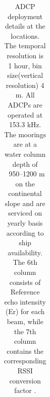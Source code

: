 \documentclass[authoryear,review,12pt]{elsarticle}
\begin{document}
\linespread{1} 	
\begin{table}[htbp]

	{\footnotesize

		\captionsetup{justification=justified,font=footnotesize,skip=0.05\baselineskip} %
		\caption{ADCP deployment details at the locations. The temporal resolution is 1 hour, bin size(vertical resolution) 4 m. All ADCPs are operated at 153.3 kHz. The moorings are at a water column depth of ~950--1200 m on the continental slope and are serviced on yearly basis according to ship availability. The 6th column consists of Reference echo intensity (Er) for each beam, while the 7th column contains the corresponding RSSI conversion factor \citep{deines1999backscatter}.}
		\begin{adjustwidth}{-0.45in}{0in} 
			\begin{tabular}{ccccccc}
				

\end{tabular}
\end{adjustwidth}}
\end{table}
\end{document}
